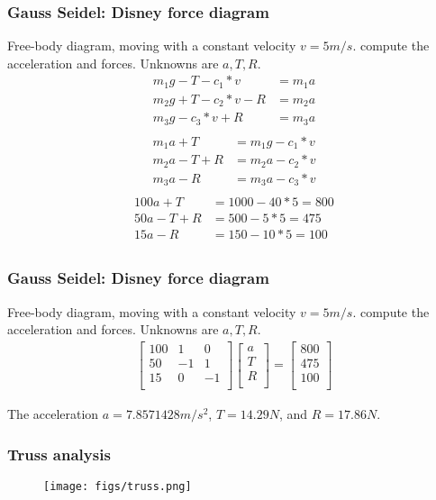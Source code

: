 \documentclass[notes]{beamer}
\begin{document}
\begin{frame}
	\frametitle{Gauss Seidel: Disney force diagram}
	Free-body diagram, moving with a constant velocity $v = 5 m/s$. compute the acceleration and forces. Unknowns are $a, T, R$.
	\begin{align*}
		m_1 g - T - c_1 * v & = m_1 a \\
		m_2 g + T - c_2 * v - R &= m_2 a \\
		m_3 g     - c_3 * v + R & = m_3 a \\
	\end{align*}
	\begin{align*}
	m_1 a + T & = m_1 g - c_1 * v \\
	m_2 a - T + R &= m_2 a - c_2 * v \\
	m_3 a     - R & = m_3 a - c_3 * v \\
	\end{align*}
	\begin{align*}
		100 a + T & = 1000 - 40 * 5 = 800\\
		50 a - T + R &= 500 - 5 * 5  = 475\\
		15 a     - R & = 150 - 10 * 5 = 100 \\
	\end{align*}
\end{frame}

\begin{frame}
	\frametitle{Gauss Seidel: Disney force diagram}
	Free-body diagram, moving with a constant velocity $v = 5 m/s$. compute the acceleration and forces. Unknowns are $a, T, R$.
	\begin{align*}
		\begin{bmatrix}
			100 & 1 & 0 \\
			50 & -1 & 1 \\
			15 & 0 & -1 \\
		\end{bmatrix}
		\begin{bmatrix}
			a \\
			T \\
			R \\
		\end{bmatrix} = 
		\begin{bmatrix}
		800 \\
		475 \\
		100 \\
	\end{bmatrix}
	\end{align*}

	The acceleration $a = 7.8571428 m/s^2$, $T= 14.29N$, and $R=17.86 N$.
\end{frame}
\begin{frame}
	\frametitle{Truss analysis}
	\begin{figure}[ht]
		\centering
		\texttt{[image: figs/truss.png]}
	\end{figure}
\end{frame}
\end{document}
